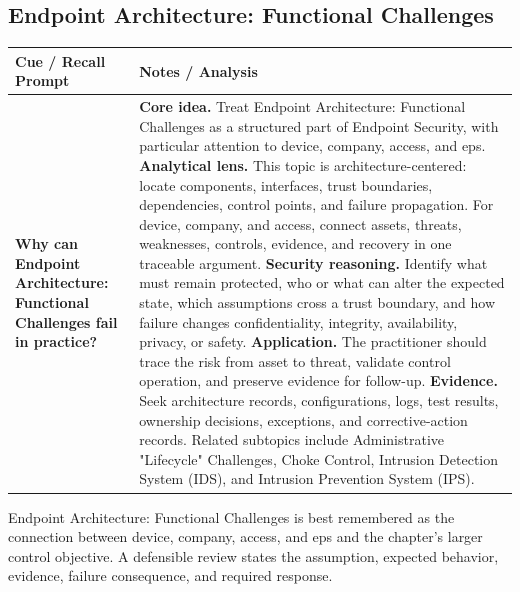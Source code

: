 \documentclass[11pt]{article}
\newcommand{\CornellHeader}{%
\rowcolor{Navy}\color{white}\bfseries Cue / Recall Prompt & \color{white}\bfseries Notes / Analysis\\\hline}
\newcommand{\CornellRow}[2]{%
\cellcolor{CueGray}\RaggedRight\textbf{#1} & \RaggedRight #2\\\hline}
\begin{document}
\subsection*{Endpoint Architecture: Functional Challenges}
\begin{longtable}{>{\RaggedRight\arraybackslash}p{}|>{\RaggedRight\arraybackslash}p{}}
\CornellHeader
\CornellRow{Why can Endpoint Architecture: Functional Challenges fail in practice?}{\textbf{Core idea.} Treat Endpoint Architecture: Functional Challenges as a structured part of Endpoint Security, with particular attention to device, company, access, and eps. \textbf{Analytical lens.} This topic is architecture-centered: locate components, interfaces, trust boundaries, dependencies, control points, and failure propagation. For device, company, and access, connect assets, threats, weaknesses, controls, evidence, and recovery in one traceable argument. \textbf{Security reasoning.} Identify what must remain protected, who or what can alter the expected state, which assumptions cross a trust boundary, and how failure changes confidentiality, integrity, availability, privacy, or safety. \textbf{Application.} The practitioner should trace the risk from asset to threat, validate control operation, and preserve evidence for follow-up. \textbf{Evidence.} Seek architecture records, configurations, logs, test results, ownership decisions, exceptions, and corrective-action records. Related subtopics include Administrative "Lifecycle" Challenges, Choke Control, Intrusion Detection System (IDS), and Intrusion Prevention System (IPS).}
\end{longtable}
\begin{topicsummary}
Endpoint Architecture: Functional Challenges is best remembered as the connection between device, company, access, and eps and the chapter's larger control objective. A defensible review states the assumption, expected behavior, evidence, failure consequence, and required response.
\end{topicsummary}
\end{document}
